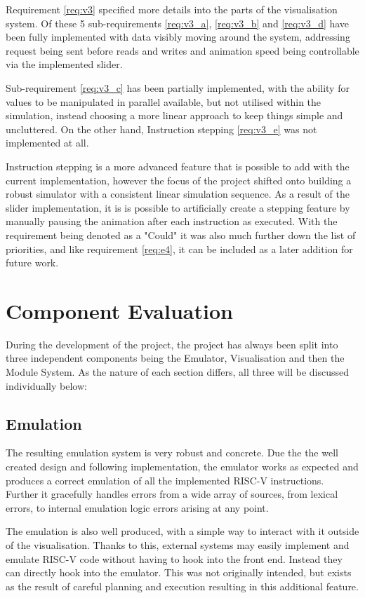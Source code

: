 Requirement \ref{req:v3} specified more details into the parts of the visualisation system. Of these 5 sub-requirements \ref{req:v3_a}, \ref{req:v3_b} and \ref{req:v3_d} have been fully implemented with data visibly moving around the system, addressing request being sent before reads and writes and animation speed being controllable via the implemented slider.

Sub-requirement \ref{req:v3_c} has been partially implemented, with the ability for values to be manipulated in parallel available, but not utilised within the simulation, instead choosing a more linear approach to keep things simple and uncluttered. On the other hand, Instruction stepping \ref{req:v3_e} was not implemented at all. 

Instruction stepping is a more advanced feature that is possible to add with the current implementation, however the focus of the project shifted onto building a robust simulator with a consistent linear simulation sequence. As a result of the slider implementation, it is is possible to artificially create a stepping feature by manually pausing the animation after each instruction as executed. With the requirement being denoted as a "Could" it was also much further down the list of priorities, and like requirement \ref{req:e4}, it can be included as a later addition for future work.

\section{Component Evaluation}
During the development of the project, the project has always been split into three independent components being the Emulator, Visualisation and then the Module System. As the nature of each section differs, all three will be discussed individually below:

\subsection{Emulation}
The resulting emulation system is very robust and concrete. Due the the well created design and following implementation, the emulator works as expected and produces a correct emulation of all the implemented RISC-V \cite{riscv_2015_riscv} instructions. Further it gracefully handles errors from a wide array of sources, from lexical errors, to internal emulation logic errors arising at any point.

The emulation is also well produced, with a simple way to interact with it outside of the visualisation. Thanks to this, external systems may easily implement and emulate RISC-V code without having to hook into the front end. Instead they can directly hook into the emulator. This was not originally intended, but exists as the result of careful planning and execution resulting in this additional feature.


